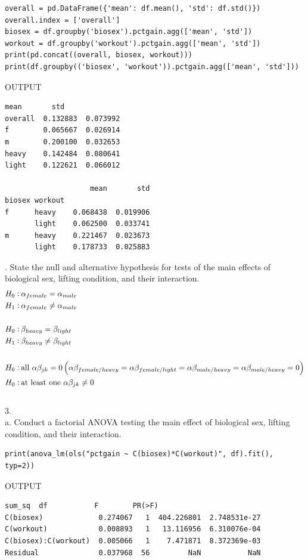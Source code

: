 \documentclass[onecolumn,10pt]{jhwhw}
\begin{document}
\begin{lstlisting}
overall = pd.DataFrame({'mean': df.mean(), 'std': df.std()})
overall.index = ['overall']
biosex = df.groupby('biosex').pctgain.agg(['mean', 'std'])
workout = df.groupby('workout').pctgain.agg(['mean', 'std'])
print(pd.concat((overall, biosex, workout)))
print(df.groupby(('biosex', 'workout')).pctgain.agg(['mean', 'std']))
\end{lstlisting}
\noindent OUTPUT
\begin{lstlisting}[language={}]
             mean       std
overall  0.132883  0.073992
f        0.065667  0.026914
m        0.200100  0.032653
heavy    0.142484  0.080641
light    0.122621  0.066012

                    mean       std
biosex workout
f      heavy    0.068438  0.019906
       light    0.062500  0.033741
m      heavy    0.221467  0.023673
       light    0.178733  0.025883
\end{lstlisting}
\vspace{1em}
. State the null and alternative hypothesis for tests of the main effects of biological sex, lifting condition, and their interaction.
\begin{align*}
H_0: \hspace{0.2em} &\alpha_{female} = \alpha_{male} \\
H_1: \hspace{0.2em} &\alpha_{female} \neq \alpha_{male}\\
\hspace{0.2em} &\\
H_0: \hspace{0.2em} &\beta_{heavy} = \beta_{light} \\
H_1: \hspace{0.2em} &\beta_{heavy} \neq \beta_{light}\\
\hspace{0.2em} &\\
H_0: \hspace{0.2em} &\mbox{all } \alpha \beta_{jk} = 0 \left(\alpha \beta_{female/heavy} = \alpha \beta_{female/light} = \alpha \beta_{male/heavy} = \alpha \beta_{male/heavy} =0\right)\\
H_0: \hspace{0.2em} &\mbox{at least one } \alpha \beta_{jk} \neq 0
\end{align*}\\
3.\\
a. Conduct a factorial ANOVA testing the main effect of biological sex, lifting condition, and their interaction.
\begin{lstlisting}
print(anova_lm(ols("pctgain ~ C(biosex)*C(workout)", df).fit(), typ=2))
\end{lstlisting}
\noindent OUTPUT
\begin{lstlisting}[language={}]
                        sum_sq  df           F        PR(>F)
C(biosex)             0.274067   1  404.226801  2.748531e-27
C(workout)            0.008893   1   13.116956  6.310076e-04
C(biosex):C(workout)  0.005066   1    7.471871  8.372369e-03
Residual              0.037968  56         NaN           NaN
\end{lstlisting}
\end{document}
